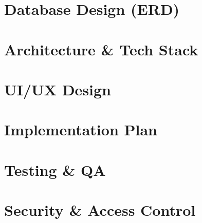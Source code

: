 \documentclass[11pt,a4paper]{report}
\begin{document}
\chapter{Database Design (ERD)}
\label{sec:3-5}



\chapter{Architecture \& Tech Stack}
\label{sec:3-6}



\chapter{UI/UX Design}
\label{sec:3-7}



\chapter{Implementation Plan}
\label{sec:3-8}



\chapter{Testing \& QA}
\label{sec:3-9}



\chapter{Security \& Access Control}
\label{sec:3-10}
\end{document}
